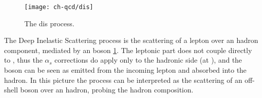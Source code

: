 \begin{figure}
	\centering
	\texttt{[image: ch-qcd/dis]}
	\caption{The \acrfull{dis} process.}
	\label{fig:qcd/dis}
\end{figure}

The Deep Inelastic Scattering process is the scattering of a lepton over an
hadron component, mediated by an \ew boson \cref{fig:qcd/dis}.
%
The leptonic part does not couple directly to \qcd , thus the $\alpha_s$
corrections do apply only to the hadronic side (at \lo \ew), and the \ew boson
can be seen as emitted from the incoming lepton and absorbed into the hadron.
%
In this picture the process can be interpreted as the scattering of an
off-shell \ew boson over an hadron, probing the hadron composition.
